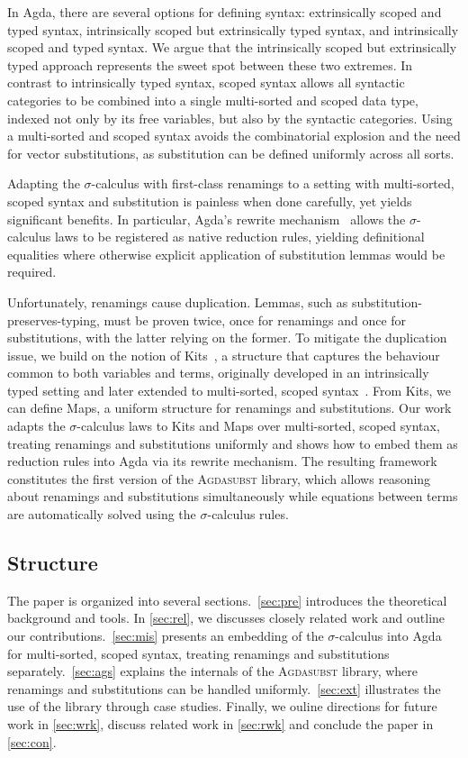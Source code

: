 \documentclass[screen,nonacm]{acmart}
\begin{document}
In Agda, there are several options for defining syntax: extrinsically scoped
and typed syntax, intrinsically scoped but extrinsically typed syntax, and
intrinsically scoped and typed syntax. We argue that the intrinsically scoped
but extrinsically typed approach represents the sweet spot between these two
extremes. In contrast to intrinsically typed syntax, scoped syntax allows all
syntactic categories to be combined into a single multi-sorted and scoped data
type, indexed not only by its free variables, but also by the syntactic
categories. Using a multi-sorted and scoped syntax avoids the combinatorial
explosion and the need for vector substitutions, as substitution can be defined
uniformly across all sorts.

Adapting the $σ$-calculus with first-class renamings to a setting with
multi-sorted, scoped syntax and substitution is painless when done carefully,
yet yields significant benefits. In particular, Agda’s rewrite
mechanism~\cite{10.1145/3434341} allows the $σ$-calculus laws to be registered
as native reduction rules, yielding definitional equalities where otherwise
explicit application of substitution lemmas would be required.

Unfortunately, renamings cause duplication. Lemmas, such as
substitution-preserves-typing, must be proven twice, once for renamings and
once for substitutions, with the latter relying on the former. To mitigate the
duplication issue, we build on the notion of Kits~\cite{ren-sub}, a structure
that captures the behaviour common to both variables and terms, originally
developed in an intrinsically typed setting and later extended to multi-sorted,
scoped syntax~\cite{saffrich:LIPIcs.ITP.2024.32}. From Kits, we can define
Maps, a uniform structure for renamings and substitutions. Our work adapts the
$σ$-calculus laws to Kits and Maps over multi-sorted, scoped syntax, treating
renamings and substitutions uniformly and shows how to embed them as reduction
rules into Agda via its rewrite mechanism. The resulting framework constitutes
the first version of the \textsc{Agdasubst} library, which allows reasoning
about renamings and substitutions simultaneously while equations between terms
are automatically solved using the $σ$-calculus rules.

\subsection*{Structure}
The paper is organized into several sections.\ \cref{sec:pre} introduces the
theoretical background and tools. In \cref{sec:rel}, we discusses closely
related work and outline our contributions.\ \cref{sec:mis} presents an
embedding of the $σ$-calculus into Agda for multi-sorted, scoped syntax,
treating renamings and substitutions separately.\ \cref{sec:ags} explains the
internals of the \textsc{Agdasubst} library, where renamings and substitutions
can be handled uniformly.\ \cref{sec:ext} illustrates the use of the library
through case studies. Finally, we ouline directions for future work in
\cref{sec:wrk}, discuss related work in \cref{sec:rwk} and conclude the paper
in \cref{sec:con}.
\end{document}
